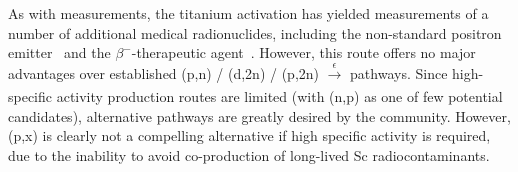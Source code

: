 As with  measurements, the titanium activation has  yielded measurements of  a number of additional  medical  radionuclides,  including the non-standard positron emitter
\,\cite{Muller2013,Filosofov2010,Qaim2011}
and the $\beta^-$-therapeutic agent 
\,\cite{Muller2014,Deilami-nezhad2016}.
However, this route offers no major advantages over established (p,n) / (d,2n) / (p,2n) $\xrightarrow[]{\epsilon}$  pathways.
Since high-specific activity  production routes are limited (with  (n,p) as one of few potential candidates), alternative pathways are greatly desired by the community.
However, (p,x) is clearly not a compelling alternative if high specific activity is required, due to the inability to avoid co-production of long-lived Sc radiocontaminants.





